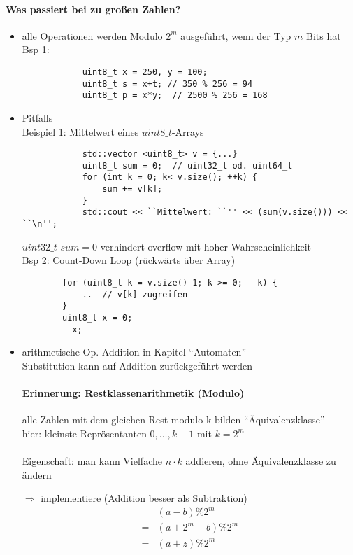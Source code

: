 \documentclass{article}
\begin{document}
	\paragraph{Was passiert bei zu großen Zahlen?}
	\begin{itemize}
		\item alle Operationen werden Modulo $2^m$ ausgeführt, wenn der Typ $m$ Bits hat \\
		Bsp 1:
		\begin{lstlisting}
			uint8_t x = 250, y = 100;
			uint8_t s = x+t; // 350 % 256 = 94
			uint8_t p = x*y;  // 2500 % 256 = 168
		\end{lstlisting}
		\item Pitfalls \\
		Beispiel 1: Mittelwert eines $uint8\_t$-Arrays
		\begin{lstlisting}
			std::vector <uint8_t> v = {...}
			uint8_t sum = 0;  // uint32_t od. uint64_t
			for (int k = 0; k< v.size(); ++k) {
				sum += v[k];
			}
			std::cout << ``Mittelwert: ``'' << (sum(v.size())) << ``\n'';
		\end{lstlisting}
		$uint32\_t$ $sum = 0$ verhindert overflow mit hoher Wahrscheinlichkeit\\

		Bsp 2: Count-Down Loop (rückwärts über Array)
	\begin{lstlisting}
		for (uint8_t k = v.size()-1; k >= 0; --k) {
			..  // v[k] zugreifen
		}
		uint8_t x = 0;
		--x;
	\end{lstlisting}

	\item arithmetische Op. Addition in Kapitel ``Automaten'' \\
	Substitution kann auf Addition zurückgeführt werden \\

\paragraph{Erinnerung: Restklassenarithmetik (Modulo)}
	alle Zahlen mit dem gleichen Rest modulo k bilden ``Äquivalenzklasse'' \\

	hier: kleinste Reprösentanten $0, \dots , k-1$ mit $k=2^{m}$ \\ \\
	Eigenschaft: man kann Vielfache $n \cdot k$ addieren, ohne Äquivalenzklasse zu ändern

	$\Rightarrow$ implementiere (Addition besser als Subtraktion)
	\begin{align*}
		&(a-b) \% 2^m \\
		= &(a+2^m-b)\%2^m \\
		= &(a+z)\% 2^m
	\end{align*}

	\end{itemize}
\end{document}
